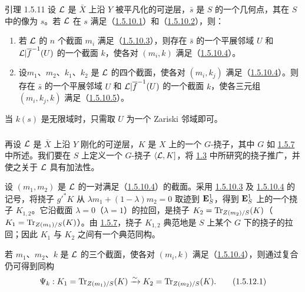 \begin{enonce*}{引理 1.5.11}
设 ${\mathcal L}$ 是 $\bar{X}$ 上沿 $Y$ 被平凡化的可逆层，$\bar{s}$ 是 $S$ 的一个几何点，其在 $S$ 中的像为 $s$。若 ${\mathcal L}$ 在 $s$ 满足（\hyperref[XVIII.par1.5.10.1]{1.5.10.1}）和（\hyperref[XVIII.par1.5.10.2]{1.5.10.2}），则：
\begin{enumerate}
\renewcommand{\theenumi}{\Roman{enumi}}
\renewcommand{\labelenumi}{(\theenumi)}
\item 若 ${\mathcal L}$ 的 $n$ 个截面 $m_{i}$ 满足（\hyperref[XVIII.par1.5.10.3]{1.5.10.3}），则存在 $\bar{s}$ 的一个平展邻域 $U$ 和 ${\mathcal L}|\overline{f}^{-1}(U)$ 的一个截面 $k$，使各对 $(m_{i},k)$ 满足（\hyperref[XVIII.par1.5.10.4]{1.5.10.4}）。

\item 设\pageoriginale $m_{1}$、$m_{2}$、$k_{1}$、$k_{2}$ 是 ${\mathcal L}$ 的四个截面，使各对 $(m_{i},k_{j})$ 满足（\hyperref[XVIII.par1.5.10.4]{1.5.10.4}）。则存在 $\bar{s}$ 的一个平展邻域 $U$ 和 ${\mathcal L}|\overline{f}^{-1}(U)$ 的一个截面 $k$，使各三元组 $(m_{i}, k_{j}, k)$ 满足（\hyperref[XVIII.par1.5.10.5]{1.5.10.5}）。
\end{enumerate}
\end{enonce*}

当 $k(s)$ 是无限域时，只需取 $U$ 为一个 Zariski 邻域即可。

\setcounter{subsubsection}{11}
\subsubsection{}
再设 ${\mathcal L}$ 是 $\bar{X}$ 上沿 $Y$ 刚化的可逆层，$K$ 是 $X$ 上的一个 $G$-挠子，其中 $G$ 如 \hyperref[XVIII.lem1.5.7]{1.5.7} 中所述。我们要在 $S$ 上定义一个 $G$-挠子 $\langle {\mathcal L},K]$，将 \hyperref[XVIII.subsec1.3]{1.3} 中所研究的挠子推广，并使之关于 ${\mathcal L}$ 具有加法性。

设 $(m_{1},m_{2})$ 是 ${\mathcal L}$ 的一对满足（\hyperref[XVIII.par1.5.10.4]{1.5.10.4}）的截面。采用 \hyperref[XVIII.par1.5.10.3]{1.5.10.3} 及 \hyperref[XVIII.par1.5.10.4]{1.5.10.4} 的记号，将挠子 ${g'}^{\ast}K$ 从 $\lambda m_{1}+(1-\lambda)m_{2}=0$ 取迹到 $\mathbf{E}^{1}_{S}$，得到 $\mathbf{E}^{1}_{S}$ 上的一个挠子 $K_{1,2}$。它沿截面 $\lambda =0$（\resp $\lambda = 1$）的拉回，是挠子 $K_{2}=\operatorname{Tr}_{Z(m_{2})/S}(K)$（\resp $K_{1}=\operatorname{Tr}_{Z(m_{1})/S}(K)$）。由 \hyperref[XVIII.lem1.5.7]{1.5.7}，挠子 $K_{1,2}$ 典范地是 $S$ 上某个 $G$ 下的挠子的拉回；因此 $K_{1}$ 与 $K_{2}$ 之间有一个典范同构。

若 $m_{1}$、$m_{2}$、$k$ 是 ${\mathcal L}$ 的三个截面，使各对 $(m_{i},k)$ 满足（\hyperref[XVIII.par1.5.10.4]{1.5.10.4}），则通过复合仍可得到同构
\begin{equation*}
\Psi_{k}:K_{1}=\operatorname{Tr}_{Z(m_{1})/S}(K)\xrightarrow{\sim}
K_{2}=\operatorname{Tr}_{Z(m_{2})/S}(K){}.\tag{1.5.12.1}
\end{equation*}


